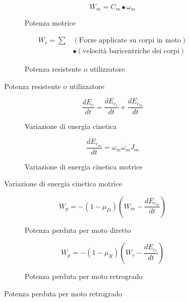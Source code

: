 \documentclass[main.tex]{subfiles}
\begin{document}
\begin{figure}[H]
  \begin{subfigure}[b]{.5\textwidth}
  \centering
\[
	W_m = C_m\bullet\omega_m
\]
  \caption{Potenza motrice}
  \end{subfigure}
  \hfill
  \begin{subfigure}[b]{.5\textwidth}
  \centering
\begin{align*}
	W_r = 	\sum &(\text{Forze applicate su corpi in moto})\\&\bullet(\text{velocità baricentriche dei corpi})
\end{align*}
  \caption{Potenza resistente o utilizzatore}
  \end{subfigure}
\end{figure}

\begin{figure}[H]
  \begin{subfigure}[b]{.5\textwidth}
  \centering
\[
	\dfrac{dE_c}{dt} = \dfrac{dE_{c_r}}{dt} + \dfrac{dE_{c_m}}{dt}
\]
  \caption{Variazione di energia cinetica}
  \end{subfigure}
  \hfill
  \begin{subfigure}[b]{.5\textwidth}
  \centering
\[
	\dfrac{dE_{c_m}}{dt} = \omega_m \dot{\omega}_m J_m
\]
  \caption{Variazione di energia cinetica motrice}
  \end{subfigure}
\end{figure}

\begin{figure}[H]
  \begin{subfigure}[b]{.5\textwidth}
  \centering
\[
	W_p = -(1-\mu_D)(W_m - \dfrac{dE_{c_m}}{dt})
\]
  \caption{Potenza perduta per moto diretto}
  \end{subfigure}
  \hfill
  \begin{subfigure}[b]{.5\textwidth}
  \centering
\[
	W_p = -(1-\mu_R)(W_r - \dfrac{dE_{c_r}}{dt})
\]
  \caption{Potenza perduta per moto retrogrado}
  \end{subfigure}
\end{figure}
\end{document}
